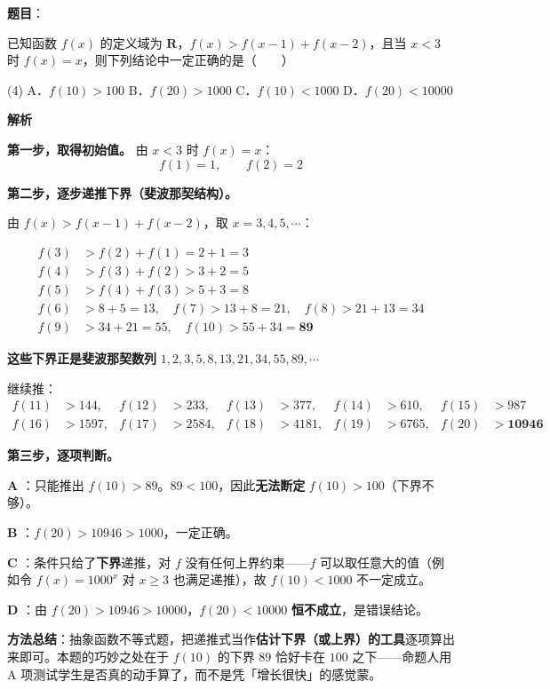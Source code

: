 \begin{answer}

\textbf{题目}：

已知函数 $f(x)$ 的定义域为 $\mathbf R$，$f(x)>f(x-1)+f(x-2)$，且当 $x<3$ 时 $f(x)=x$，则下列结论中一定正确的是\mbox{（　　）}

\begin{gkopts}(4)
\task A．$f(10)>100$
\task B．$f(20)>1000$
\task C．$f(10)<1000$
\task D．$f(20)<10000$
\end{gkopts}

\textbf{解析}

\textbf{第一步，取得初始值。} 由 $x<3$ 时 $f(x)=x$：
\nopagebreak[4]
\[f(1)=1,\qquad f(2)=2\]

\textbf{第二步，逐步递推下界（斐波那契结构）。}

由 $f(x)>f(x-1)+f(x-2)$，取 $x=3,4,5,\cdots$：

\nopagebreak[4]
\[\begin{aligned}
f(3)&>f(2)+f(1)=2+1=3\\
f(4)&>f(3)+f(2)>3+2=5\\
f(5)&>f(4)+f(3)>5+3=8\\
f(6)&>8+5=13,\quad f(7)>13+8=21,\quad f(8)>21+13=34\\
f(9)&>34+21=55,\quad f(10)>55+34=\mathbf{89}
\end{aligned}\]

\textbf{这些下界正是斐波那契数列} $1,2,3,5,8,13,21,34,55,89,\cdots$

继续推：
\nopagebreak[4]
\[\begin{aligned}
f(11)&>144,& f(12)&>233,& f(13)&>377,& f(14)&>610,& f(15)&>987\\
f(16)&>1597,& f(17)&>2584,& f(18)&>4181,& f(19)&>6765,& f(20)&>\mathbf{10946}
\end{aligned}\]

\textbf{第三步，逐项判断。}

\textbf{A }：只能推出 $f(10)>89$。$89<100$，因此\textbf{无法断定} $f(10)>100$（下界不够）。

\textbf{B }：$f(20)>10946>1000$，一定正确。

\textbf{C }：条件只给了\textbf{下界}递推，对 $f$ 没有任何上界约束——$f$ 可以取任意大的值（例如令 $f(x)=1000^{x}$ 对 $x\ge3$ 也满足递推），故 $f(10)<1000$ 不一定成立。

\textbf{D }：由 $f(20)>10946>10000$，$f(20)<10000$ \textbf{恒不成立}，是错误结论。

\begin{gktip}
\textbf{方法总结}：抽象函数不等式题，把递推式当作\textbf{估计下界（或上界）的工具}逐项算出来即可。本题的巧妙之处在于 $f(10)$ 的下界 $89$ 恰好卡在 $100$ 之下——命题人用 A 项测试学生是否真的动手算了，而不是凭「增长很快」的感觉蒙。
\end{gktip}


\par\medskip

\end{answer}

